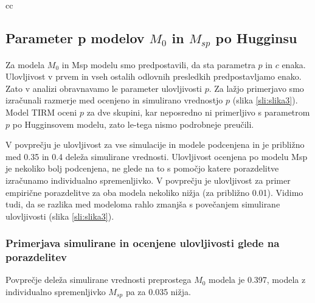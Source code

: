 \begin{table}[!htb]
\begin{tabular}{cc}
    \begin{minipage}{.33\linewidth}
      \caption*{Razlike med matrikama}
    \end{minipage}
\end{tabular}
\end{table}

\subsection{Parameter p modelov $M_0$ in $M_{sp}$ po Hugginsu}
Za modela $M_0$ in Msp modelu smo predpostavili, da sta parametra $p$ in $c$ enaka. Ulovljivost v prvem in vseh ostalih odlovnih presledkih predpostavljamo enako. Zato v analizi obravnavamo le parameter ulovljivosti $p$. Za lažjo primerjavo smo izračunali razmerje med ocenjeno in simulirano vrednostjo $p$ (slika \ref{sli:slika3}). Model TIRM oceni $p$ za dve skupini, kar neposredno ni primerljivo s parametrom $p$ po Hugginsovem modelu, zato le-tega nismo podrobneje preučili.

V povprečju je ulovljivost za vse simulacije in modele podcenjena in je približno med 0.35 in 0.4 deleža simulirane vrednosti. Ulovljivost ocenjena po modelu Msp je nekoliko bolj podcenjena, ne glede na to s pomočjo katere porazdelitve izračunamo individualno spremenljivko. V povprečju je ulovljivost za primer empirične porazdelitve za oba modela nekoliko nižja (za približno 0.01). Vidimo tudi, da se razlika med modeloma rahlo zmanjša s povečanjem simulirane ulovljivosti (slika \ref{sli:slika3}).

\subsubsection{Primerjava simulirane in ocenjene ulovljivosti glede na porazdelitev}
Povprečje deleža simulirane vrednosti preprostega $M_0$ modela je 0.397, modela z individualno spremenljivko $M_{sp}$ pa za 0.035 nižja.

